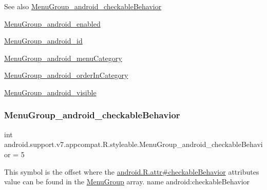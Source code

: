 \begin{DoxySeeAlso}{See also}
\hyperlink{classandroid_1_1support_1_1v7_1_1appcompat_1_1R_1_1styleable_a81c92bdcef0247bfbaf1616441e84e39}{Menu\+Group\+\_\+android\+\_\+checkable\+Behavior} 

\hyperlink{classandroid_1_1support_1_1v7_1_1appcompat_1_1R_1_1styleable_a4782001699ff1d7ca6e5d980a24c84e2}{Menu\+Group\+\_\+android\+\_\+enabled} 

\hyperlink{classandroid_1_1support_1_1v7_1_1appcompat_1_1R_1_1styleable_a0a48840ef12641278f59d649848b5f19}{Menu\+Group\+\_\+android\+\_\+id} 

\hyperlink{classandroid_1_1support_1_1v7_1_1appcompat_1_1R_1_1styleable_a35100e1fc0cb3941a2ad2c2959577785}{Menu\+Group\+\_\+android\+\_\+menu\+Category} 

\hyperlink{classandroid_1_1support_1_1v7_1_1appcompat_1_1R_1_1styleable_ac2d28f0b25e2c37ce47ebcdb3e77a354}{Menu\+Group\+\_\+android\+\_\+order\+In\+Category} 

\hyperlink{classandroid_1_1support_1_1v7_1_1appcompat_1_1R_1_1styleable_a33d810ee43eb154abdf62fc395a41cc6}{Menu\+Group\+\_\+android\+\_\+visible} 
\end{DoxySeeAlso}
\mbox{\label{classandroid_1_1support_1_1v7_1_1appcompat_1_1R_1_1styleable_a81c92bdcef0247bfbaf1616441e84e39}} 
\subsubsection{\texorpdfstring{Menu\+Group\+\_\+android\+\_\+checkable\+Behavior}{MenuGroup\_android\_checkableBehavior}}
{\footnotesize\ttfamily int android.\+support.\+v7.\+appcompat.\+R.\+styleable.\+Menu\+Group\+\_\+android\+\_\+checkable\+Behavior = 5\hspace{0.3cm}{\ttfamily [static]}}

This symbol is the offset where the \hyperlink{}{android.\+R.\+attr\#checkable\+Behavior} attribute\textquotesingle{}s value can be found in the \hyperlink{classandroid_1_1support_1_1v7_1_1appcompat_1_1R_1_1styleable_aef793c0a19e198b57791fed45ec2804e}{Menu\+Group} array.  name android\+:checkable\+Behavior \mbox{\label{classandroid_1_1support_1_1v7_1_1appcompat_1_1R_1_1styleable_a4782001699ff1d7ca6e5d980a24c84e2}} 
